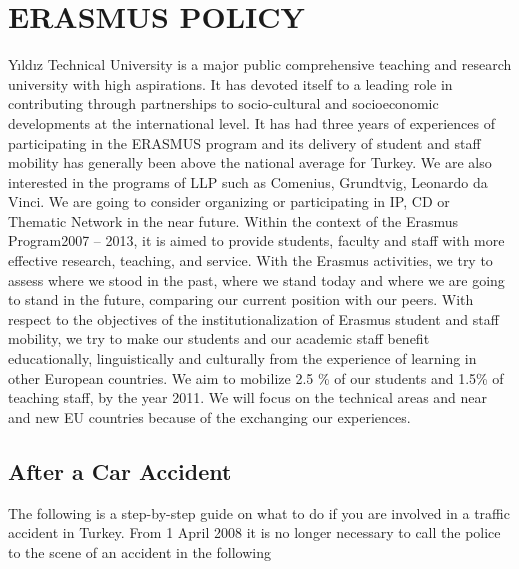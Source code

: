 \chapter{ERASMUS POLICY}
Yıldız Technical University is a major public comprehensive teaching and research university with high aspirations. It has devoted itself to a leading role in contributing through partnerships to socio-cultural and socioeconomic developments at the international level. It has had three years of experiences of participating in the ERASMUS program and its delivery of student and staff mobility has generally been above the national average for Turkey. We are also interested in the programs of LLP such as Comenius, Grundtvig, Leonardo da Vinci. We are going to consider organizing or participating in IP, CD or Thematic Network in the near future. Within the context of the Erasmus Program2007 – 2013, it is aimed to provide students, faculty and staff with more effective research, teaching, and service. With the Erasmus activities, we try to assess where we stood in the past, where we stand today and where we are going to stand in the future, comparing our current position with our peers. With respect to the objectives of the institutionalization of Erasmus student and staff mobility, we try to make our students and our academic staff benefit educationally, linguistically and culturally from the experience of learning in other European countries. We aim to mobilize 2.5 \% of our students and 1.5\% of teaching staff, by the year 2011. We will focus on the technical areas and near and new EU countries because of the exchanging our experiences.

\section{After a Car Accident}
The following is a step-by-step guide on what to do if you are involved in a traffic accident in Turkey.
From 1 April 2008 it is no longer necessary to call the police to the scene of an accident in the following